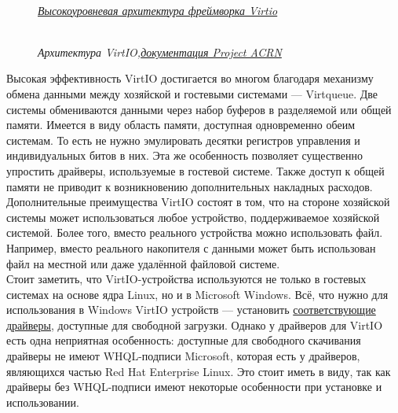 \documentclass[14pt, a4paper]{article}
\begin{document}
\newpage
\begin{figure}[h]
    \centering
    \\ 
    \href{https://developer.ibm.com/articles/l-virtio/}{\small\textit{Высокоуровневая архитектура фреймворка Virtio}} 
    \label{framework} 
\end{figure}

\begin{figure}[h]
    \centering
    \\ 
    \small\textit{Архитектура VirtIO,}\href{https://projectacrn.github.io/latest/developer-guides/hld/hld-virtio-devices.html#architecture}{\small\textit{документация Project ACRN}} 
    \label{framework} 
\end{figure}

Высокая эффективность VirtIO достигается во многом благодаря механизму обмена данными между
хозяйской и гостевыми системами — Virtqueue. Две системы обмениваются данными через набор
буферов в разделяемой или общей памяти. Имеется в виду область памяти, доступная одновременно
обеим системам. То есть не нужно эмулировать десятки регистров управления и индивидуальных
битов в них. Эта же особенность позволяет существенно упростить драйверы, используемые в
гостевой системе. Также доступ к общей памяти не приводит к возникновению дополнительных
накладных расходов.\\

Дополнительные преимущества VirtIO состоят в том, что на стороне хозяйской системы может
использоваться любое устройство, поддерживаемое хозяйской системой. Более того, вместо
реального устройства можно использовать файл. Например, вместо реального накопителя с данными
может быть использован файл на местной или даже удалённой файловой системе.\\

Стоит заметить, что VirtIO-устройства используются не только в гостевых системах на основе ядра
Linux, но и в Microsoft Windows. Всё, что нужно для использования в Windows VirtIO устройств —
установить \href{http://www.linux-kvm.org/page/WindowsGuestDrivers}{соответствующие драйверы}, доступные для свободной загрузки. Однако у драйверов для
VirtIO есть одна неприятная особенность: доступные для свободного скачивания драйверы не имеют
WHQL-подписи Microsoft, которая есть у драйверов, являющихся частью Red Hat Enterprise Linux. Это
стоит иметь в виду, так как драйверы без WHQL-подписи имеют некоторые особенности при установке
и использовании.\\
\end{document}

